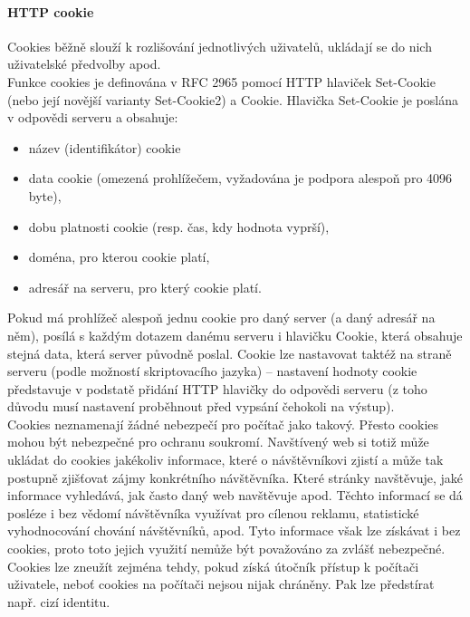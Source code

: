 \documentclass[10pt,a4paper]{article}
\begin{document}
\paragraph{HTTP cookie} Cookies běžně slouží k rozlišování jednotlivých uživatelů, ukládají se do nich uživatelské předvolby apod. \\
Funkce cookies je definována v RFC 2965 pomocí HTTP hlaviček Set-Cookie (nebo její novější varianty Set-Cookie2) a Cookie. Hlavička Set-Cookie je poslána v odpovědi serveru a obsahuje:
\begin{itemize}
	\item název (identifikátor) cookie
	\item data cookie (omezená prohlížečem, vyžadována je podpora alespoň pro 4096 byte),
	\item dobu platnosti cookie (resp. čas, kdy hodnota vyprší),
	\item doména, pro kterou cookie platí,
	\item adresář na serveru, pro který cookie platí.
\end{itemize}
Pokud má prohlížeč alespoň jednu cookie pro daný server (a daný adresář na něm), posílá s každým dotazem danému serveru i hlavičku Cookie, která obsahuje stejná data, která server původně poslal. Cookie lze nastavovat taktéž na straně serveru (podle možností skriptovacího jazyka) – nastavení hodnoty cookie představuje v podstatě přidání HTTP hlavičky do odpovědi serveru (z toho důvodu musí nastavení proběhnout před vypsání čehokoli na výstup). \\
Cookies neznamenají žádné nebezpečí pro počítač jako takový. Přesto cookies mohou být nebezpečné pro ochranu soukromí. Navštívený web si totiž může ukládat do cookies jakékoliv informace, které o návštěvníkovi zjistí a může tak postupně zjišťovat zájmy konkrétního návštěvníka. Které stránky navštěvuje, jaké informace vyhledává, jak často daný web navštěvuje apod. Těchto informací se dá posléze i bez vědomí návštěvníka využívat pro cílenou reklamu, statistické vyhodnocování chování návštěvníků, apod. Tyto informace však lze získávat i bez cookies, proto toto jejich využití nemůže být považováno za zvlášť nebezpečné. Cookies lze zneužít zejména tehdy, pokud získá útočník přístup k počítači uživatele, neboť cookies na počítači nejsou nijak chráněny. Pak lze předstírat např. cizí identitu.
\end{document}
